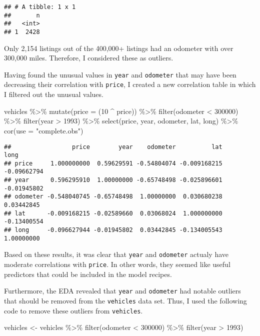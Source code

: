\documentclass[
]{article}
\newenvironment{Shaded}{\begin{snugshade}}{\end{snugshade}}
\newcommand{\AttributeTok}[1]{\textcolor[rgb]{0.77,0.63,0.00}{#1}}
\newcommand{\DecValTok}[1]{\textcolor[rgb]{0.00,0.00,0.81}{#1}}
\newcommand{\FunctionTok}[1]{\textcolor[rgb]{0.00,0.00,0.00}{#1}}
\newcommand{\NormalTok}[1]{#1}
\newcommand{\OtherTok}[1]{\textcolor[rgb]{0.56,0.35,0.01}{#1}}
\newcommand{\SpecialCharTok}[1]{\textcolor[rgb]{0.00,0.00,0.00}{#1}}
\newcommand{\StringTok}[1]{\textcolor[rgb]{0.31,0.60,0.02}{#1}}
\begin{document}
\begin{verbatim}
## # A tibble: 1 x 1
##       n
##   <int>
## 1  2428
\end{verbatim}

Only 2,154 listings out of the 400,000+ listings had an odometer with
over 300,000 miles. Therefore, I considered these as outliers.

Having found the unusual values in \texttt{year} and \texttt{odometer}
that may have been decreasing their correlation with \texttt{price}, I
created a new correlation table in which I filtered out the unusual
values.

\begin{Shaded}
\begin{Highlighting}[]
\NormalTok{vehicles }\SpecialCharTok{\%\textgreater{}\%} 
  \FunctionTok{mutate}\NormalTok{(}\AttributeTok{price =}\NormalTok{ (}\DecValTok{10} \SpecialCharTok{\^{}}\NormalTok{ price)) }\SpecialCharTok{\%\textgreater{}\%} 
  \FunctionTok{filter}\NormalTok{(odometer }\SpecialCharTok{\textless{}} \DecValTok{300000}\NormalTok{) }\SpecialCharTok{\%\textgreater{}\%} 
  \FunctionTok{filter}\NormalTok{(year }\SpecialCharTok{\textgreater{}} \DecValTok{1993}\NormalTok{) }\SpecialCharTok{\%\textgreater{}\%} 
  \FunctionTok{select}\NormalTok{(price, year, odometer, lat, long) }\SpecialCharTok{\%\textgreater{}\%} 
  \FunctionTok{cor}\NormalTok{(}\AttributeTok{use =} \StringTok{"complete.obs"}\NormalTok{)}
\end{Highlighting}
\end{Shaded}

\begin{verbatim}
##                 price        year    odometer          lat        long
## price     1.000000000  0.59629591 -0.54804074 -0.009168215 -0.09662794
## year      0.596295910  1.00000000 -0.65748498 -0.025896601 -0.01945802
## odometer -0.548040745 -0.65748498  1.00000000  0.030680238  0.03442845
## lat      -0.009168215 -0.02589660  0.03068024  1.000000000 -0.13400554
## long     -0.096627944 -0.01945802  0.03442845 -0.134005543  1.00000000
\end{verbatim}

Based on these results, it was clear that \texttt{year} and
\texttt{odometer} actualy have moderate correlations with
\texttt{price}. In other words, they seemed like useful predictors that
could be included in the model recipes.

Furthermore, the EDA revealed that \texttt{year} and \texttt{odometer}
had notable outliers that should be removed from the \texttt{vehicles}
data set. Thus, I used the following code to remove these outliers from
\texttt{vehicles}.

\begin{Shaded}
\begin{Highlighting}[]
\NormalTok{vehicles }\OtherTok{\textless{}{-}}\NormalTok{ vehicles }\SpecialCharTok{\%\textgreater{}\%} 
  \FunctionTok{filter}\NormalTok{(odometer }\SpecialCharTok{\textless{}} \DecValTok{300000}\NormalTok{) }\SpecialCharTok{\%\textgreater{}\%} 
  \FunctionTok{filter}\NormalTok{(year }\SpecialCharTok{\textgreater{}} \DecValTok{1993}\NormalTok{)}
\end{Highlighting}
\end{Shaded}
\end{document}
